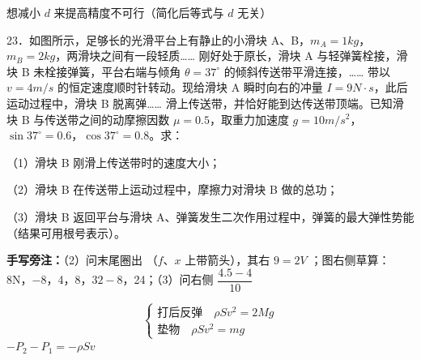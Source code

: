 想减小 $d$ 来提高精度\quad 不可行\quad （简化后等式与 $d$ 无关）
\begin{problem}[粘贴印刷题 23]
23．如图所示，足够长的光滑平台上有静止的小滑块 A、B，$m_A=1\unit{kg}$，$m_B=2\unit{kg}$，两滑块之间有一段轻质……%
刚好处于原长，滑块 A 与轻弹簧栓接，滑块 B 未栓接弹簧，平台右端与倾角 $\theta=37^\circ$ 的倾斜传送带平滑连接，……%
带以 $v=4\unit{m/s}$ 的恒定速度顺时针转动。现给滑块 A 瞬时向右的冲量 $I=9\unit{N\cdot s}$，此后运动过程中，滑块 B 脱离弹……%
滑上传送带，并恰好能到达传送带顶端。已知滑块 B 与传送带之间的动摩擦因数 $\mu=0.5$，取重力加速度 $g=10\unit{m/s^2}$，$\sin37^\circ=0.6$，$\cos37^\circ=0.8$。求：

（1）滑块 B 刚滑上传送带时的速度大小；

（2）滑块 B 在传送带上运动过程中，摩擦力对滑块 B 做的总功；

（3）滑块 B 返回平台与滑块 A、弹簧发生二次作用过程中，弹簧的最大弹性势能（结果可用根号表示）。


\medskip
\noindent\textbf{手写旁注：}（2）问末尾圈出 （$f$、$x$ 上带箭头），其右 $9=2V$%
；图右侧草算：8N，$-8$，4，8，$32-8$，24；（3）问右侧 $\dfrac{4.5-4}{10}$
\end{problem}
\[
\begin{cases}
\text{打后反弹}\quad \rho Sv^2=2Mg\\
\text{垫物}\quad \rho Sv^2=mg
\end{cases}
\]
$-P_2-P_1=-\rho Sv$ %
